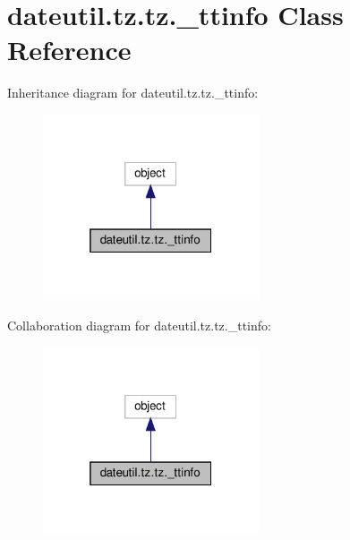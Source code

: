 \hypertarget{classdateutil_1_1tz_1_1tz_1_1__ttinfo}{}\section{dateutil.\+tz.\+tz.\+\_\+ttinfo Class Reference}
\label{classdateutil_1_1tz_1_1tz_1_1__ttinfo}


Inheritance diagram for dateutil.\+tz.\+tz.\+\_\+ttinfo\+:
\nopagebreak
\begin{figure}[H]
\begin{center}
\leavevmode
\includegraphics[width=181pt]{classdateutil_1_1tz_1_1tz_1_1__ttinfo__inherit__graph}
\end{center}
\end{figure}


Collaboration diagram for dateutil.\+tz.\+tz.\+\_\+ttinfo\+:
\nopagebreak
\begin{figure}[H]
\begin{center}
\leavevmode
\includegraphics[width=181pt]{classdateutil_1_1tz_1_1tz_1_1__ttinfo__coll__graph}
\end{center}
\end{figure}
